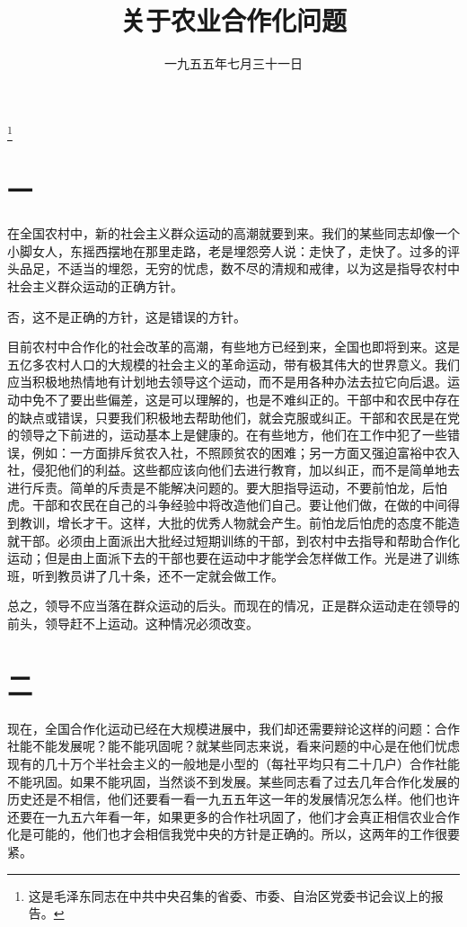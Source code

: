 
\title{关于农业合作化问题}
\date{一九五五年七月三十一日}
\thanks{这是毛泽东同志在中共中央召集的省委、市委、自治区党委书记会议上的报告。}
\maketitle


\section*{一}

在全国农村中，新的社会主义群众运动的高潮就要到来。我们的某些同志却像一个小脚女人，东摇西摆地在那里走路，老是埋怨旁人说：走快了，走快了。过多的评头品足，不适当的埋怨，无穷的忧虑，数不尽的清规和戒律，以为这是指导农村中社会主义群众运动的正确方针。

否，这不是正确的方针，这是错误的方针。

目前农村中合作化的社会改革的高潮，有些地方已经到来，全国也即将到来。这是五亿多农村人口的大规模的社会主义的革命运动，带有极其伟大的世界意义。我们应当积极地热情地有计划地去领导这个运动，而不是用各种办法去拉它向后退。运动中免不了要出些偏差，这是可以理解的，也是不难纠正的。干部中和农民中存在的缺点或错误，只要我们积极地去帮助他们，就会克服或纠正。干部和农民是在党的领导之下前进的，运动基本上是健康的。在有些地方，他们在工作中犯了一些错误，例如：一方面排斥贫农入社，不照顾贫农的困难；另一方面又强迫富裕中农入社，侵犯他们的利益。这些都应该向他们去进行教育，加以纠正，而不是简单地去进行斥责。简单的斥责是不能解决问题的。要大胆指导运动，不要前怕龙，后怕虎。干部和农民在自己的斗争经验中将改造他们自己。要让他们做，在做的中间得到教训，增长才干。这样，大批的优秀人物就会产生。前怕龙后怕虎的态度不能造就干部。必须由上面派出大批经过短期训练的干部，到农村中去指导和帮助合作化运动；但是由上面派下去的干部也要在运动中才能学会怎样做工作。光是进了训练班，听到教员讲了几十条，还不一定就会做工作。

总之，领导不应当落在群众运动的后头。而现在的情况，正是群众运动走在领导的前头，领导赶不上运动。这种情况必须改变。

\section*{二}

现在，全国合作化运动已经在大规模进展中，我们却还需要辩论这样的问题：合作社能不能发展呢？能不能巩固呢？就某些同志来说，看来问题的中心是在他们忧虑现有的几十万个半社会主义的一般地是小型的（每社平均只有二十几户）合作社能不能巩固。如果不能巩固，当然谈不到发展。某些同志看了过去几年合作化发展的历史还是不相信，他们还要看一看一九五五年这一年的发展情况怎么样。他们也许还要在一九五六年看一年，如果更多的合作社巩固了，他们才会真正相信农业合作化是可能的，他们也才会相信我党中央的方针是正确的。所以，这两年的工作很要紧。

